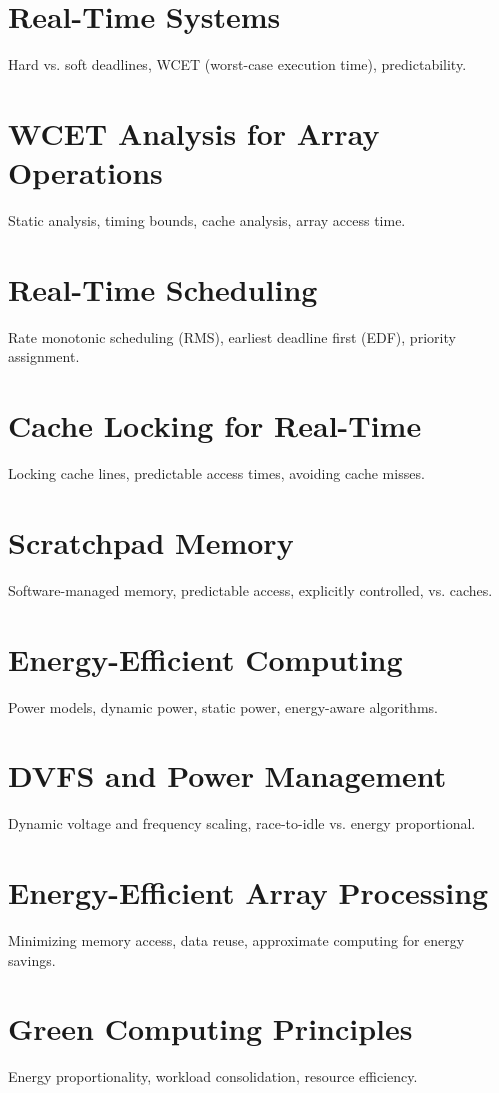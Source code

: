 
\chapter{Real-Time Systems}
Hard vs. soft deadlines, WCET (worst-case execution time), predictability.

\chapter{WCET Analysis for Array Operations}
Static analysis, timing bounds, cache analysis, array access time.

\chapter{Real-Time Scheduling}
Rate monotonic scheduling (RMS), earliest deadline first (EDF), priority assignment.

\chapter{Cache Locking for Real-Time}
Locking cache lines, predictable access times, avoiding cache misses.

\chapter{Scratchpad Memory}
Software-managed memory, predictable access, explicitly controlled, vs. caches.

\chapter{Energy-Efficient Computing}
Power models, dynamic power, static power, energy-aware algorithms.

\chapter{DVFS and Power Management}
Dynamic voltage and frequency scaling, race-to-idle vs. energy proportional.

\chapter{Energy-Efficient Array Processing}
Minimizing memory access, data reuse, approximate computing for energy savings.

\chapter{Green Computing Principles}
Energy proportionality, workload consolidation, resource efficiency.


